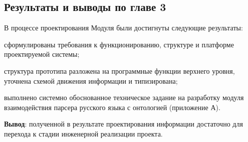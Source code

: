 \subsection{Результаты и выводы по главе 3}

В процессе проектирования Модуля были достигнуты следующие результаты:
\begin{list}{}{\leftmargin=1.5cm}
	\item сформулированы требования к функционированию, структуре и платформе проектируемой системы;
	\item структура прототипа разложена на программные функции верхнего уровня, уточнена схемой движения информации и типизирована;
	\item выполнено системно обоснованное техническое задание на разработку модуля взаимодействия парсера русского языка с онтологией (приложение А).
\end{list}

\textbf{Вывод}: полученной в результате проектирования информации достаточно для перехода к стадии инженерной реализации проекта.